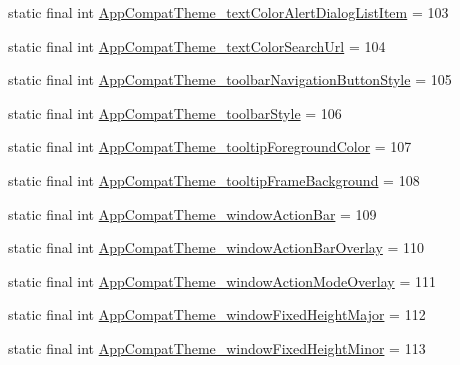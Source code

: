 \begin{DoxyCompactItemize}
\item 
static final int \mbox{\hyperlink{classandroid_1_1support_1_1v7_1_1appcompat_1_1R_1_1styleable_a22498b29580fd39a0825e692be71697a}{App\+Compat\+Theme\+\_\+text\+Color\+Alert\+Dialog\+List\+Item}} = 103
\item 
static final int \mbox{\hyperlink{classandroid_1_1support_1_1v7_1_1appcompat_1_1R_1_1styleable_a5670522074accb9485b25777e1735cef}{App\+Compat\+Theme\+\_\+text\+Color\+Search\+Url}} = 104
\item 
static final int \mbox{\hyperlink{classandroid_1_1support_1_1v7_1_1appcompat_1_1R_1_1styleable_ab58f6974601f3be1dd340d0b7b67fedd}{App\+Compat\+Theme\+\_\+toolbar\+Navigation\+Button\+Style}} = 105
\item 
static final int \mbox{\hyperlink{classandroid_1_1support_1_1v7_1_1appcompat_1_1R_1_1styleable_adcbf3e914a6c4875f17697c3e0a5330f}{App\+Compat\+Theme\+\_\+toolbar\+Style}} = 106
\item 
static final int \mbox{\hyperlink{classandroid_1_1support_1_1v7_1_1appcompat_1_1R_1_1styleable_adf90290b0a61ae9e89eb1da3a4da3d43}{App\+Compat\+Theme\+\_\+tooltip\+Foreground\+Color}} = 107
\item 
static final int \mbox{\hyperlink{classandroid_1_1support_1_1v7_1_1appcompat_1_1R_1_1styleable_a30e4ad917aa03ab0e8e5f3de2cb205eb}{App\+Compat\+Theme\+\_\+tooltip\+Frame\+Background}} = 108
\item 
static final int \mbox{\hyperlink{classandroid_1_1support_1_1v7_1_1appcompat_1_1R_1_1styleable_a54e3e68c0557978c12c85a536626483a}{App\+Compat\+Theme\+\_\+window\+Action\+Bar}} = 109
\item 
static final int \mbox{\hyperlink{classandroid_1_1support_1_1v7_1_1appcompat_1_1R_1_1styleable_a7e3bd8a86a5026ca9e855e3c8aa6b2e9}{App\+Compat\+Theme\+\_\+window\+Action\+Bar\+Overlay}} = 110
\item 
static final int \mbox{\hyperlink{classandroid_1_1support_1_1v7_1_1appcompat_1_1R_1_1styleable_ad94883f936158d1e9eb6484ab1ea146c}{App\+Compat\+Theme\+\_\+window\+Action\+Mode\+Overlay}} = 111
\item 
static final int \mbox{\hyperlink{classandroid_1_1support_1_1v7_1_1appcompat_1_1R_1_1styleable_a1f4a316a2ac90d0a80b719552a6f3726}{App\+Compat\+Theme\+\_\+window\+Fixed\+Height\+Major}} = 112
\item 
static final int \mbox{\hyperlink{classandroid_1_1support_1_1v7_1_1appcompat_1_1R_1_1styleable_a3c341d6d5f75db307f85528b4cd2dffb}{App\+Compat\+Theme\+\_\+window\+Fixed\+Height\+Minor}} = 113

\end{DoxyCompactItemize}
